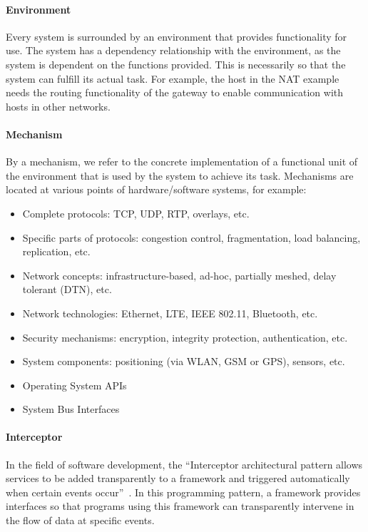 \paragraph{Environment}
Every system is surrounded by an environment that provides functionality for use.
The system has a dependency relationship with the environment, as the system is dependent on the functions provided.
This is necessarily so that the system can fulfill its actual task. For example, the host in the NAT example needs the routing functionality of the gateway to enable communication with hosts in other networks.

\paragraph{Mechanism}
By a mechanism, we refer to the concrete implementation of a functional unit of the environment that is used by the system to achieve its task.
Mechanisms are located at various points of hardware/software systems, for example:

\begin{itemize}
 \item Complete protocols: TCP, UDP, RTP, overlays, etc.
 \item Specific parts of protocols: congestion control, fragmentation, load balancing, replication, etc.
 \item Network concepts: infrastructure-based, ad-hoc, partially meshed, delay tolerant (DTN), etc.
 \item Network technologies: Ethernet, LTE, IEEE 802.11, Bluetooth, etc.
 \item Security mechanisms: encryption, integrity protection, authentication, etc.
 \item System components: positioning (via WLAN, GSM or GPS), sensors, etc.
 \item Operating System APIs
 \item System Bus Interfaces
\end{itemize}



\paragraph{Interceptor}
In the field of software development, the ``Interceptor architectural pattern allows services to be added transparently to a framework and triggered automatically when certain events occur''~\cite{schmidt2013pattern}.
In this programming pattern, a framework provides interfaces so that programs using this framework can transparently intervene in the flow of data at specific events.

